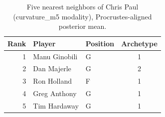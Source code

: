\begin{table}[htbp]
  \centering\small
  \begin{tabular}{rllc}
    \toprule
    Rank & Player & Position & Archetype \\
    \midrule
    1 & Manu Ginobili & G & 1 \\
    2 & Dan Majerle & G & 2 \\
    3 & Ron Holland & F & 1 \\
    4 & Greg Anthony & G & 1 \\
    5 & Tim Hardaway & G & 1 \\
    \bottomrule
  \end{tabular}
  \caption{Five nearest neighbors of Chris Paul (curvature_m5 modality), Procrustes-aligned posterior mean.}
  \label{tab:Chris_Paul_neighbors_curvature_m5}
\end{table}

